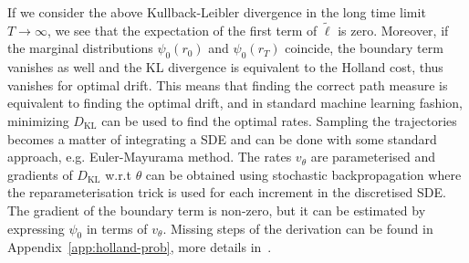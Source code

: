 If we consider the above Kullback-Leibler divergence in the long time limit $T \rightarrow \infty$, we see that the expectation of the first term of $\tilde{\ell}$ is zero. Moreover, if the marginal distributions $\psi_{0}(r_0)$ and $\psi_{0}(r_T)$ coincide, the boundary term vanishes as well and the KL divergence is equivalent to the Holland cost, thus vanishes for optimal drift. This means that finding the correct path measure is equivalent to finding the optimal drift, and in standard machine learning fashion, minimizing $D_{\mathrm{KL}}$ can be used to find the optimal rates. Sampling the trajectories becomes a matter of integrating a SDE and can be done with some standard approach, e.g. Euler-Mayurama method. The rates $v_{\theta}$ are parameterised and gradients of $D_{\mathrm{KL}}$ w.r.t $\theta$ can be obtained using stochastic backpropagation where the reparameterisation trick is used for each increment in the discretised SDE. The gradient of the boundary term is non-zero, but it can be estimated by expressing $\psi_0$ in terms of $v_{\theta}$. Missing steps of the derivation can be found in Appendix~\ref{app:holland-prob}, more details in~\cite{barr2020quantum}. 

